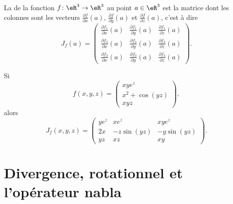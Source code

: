 La  de la fonction $f\colon \eR^3\to \eR^3$ au point $a\in\eR^3$ est la matrice dont les colonnes sont les vecteurs $\frac{ \partial f }{ \partial x }(a)$, $\frac{ \partial f }{ \partial y }(a)$ et $\frac{ \partial f }{ \partial z }(a)$, c'est à dire
\begin{equation}
    J_f(a)=\begin{pmatrix}
        \frac{ \partial f_1 }{ \partial x }(a)   &   \frac{ \partial f_1 }{ \partial y }(a)    &   \frac{ \partial f_1 }{ \partial z }(a)    \\
        \frac{ \partial f_2 }{ \partial x }(a)   &   \frac{ \partial f_2 }{ \partial y }(a)    &   \frac{ \partial f_2 }{ \partial z }(a)    \\
        \frac{ \partial f_3 }{ \partial x }(a)   &   \frac{ \partial f_3 }{ \partial y }(a)    &   \frac{ \partial f_3 }{ \partial z }(a)    
    \end{pmatrix}.
\end{equation}

\begin{example}
    Si 
    \begin{equation}
        f(x,y,z)=\begin{pmatrix}
            xy e^{z}    \\ 
            x^2+\cos(yz)    \\ 
            xyz    
        \end{pmatrix},
    \end{equation}
    alors
    \begin{equation}
        J_f(x,y,z)=\begin{pmatrix}
            ye^z    &   xe^z    &   xye^z    \\
            2x    &   -z\sin(yz)    &   -y\sin(yz)    \\
            yz    &   xz    &   xy
        \end{pmatrix}.
    \end{equation}
\end{example}

\section{Divergence, rotationnel et l'opérateur nabla}


